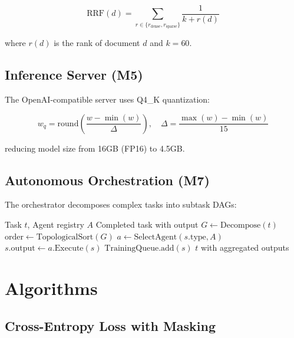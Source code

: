 \documentclass[11pt,a4paper]{article}
\theoremstyle{plain}
\theoremstyle{definition}
\begin{document}
\begin{equation}
    \text{RRF}(d) = \sum_{r \in \{r_{\text{dense}}, r_{\text{sparse}}\}} \frac{1}{k + r(d)}
    \label{eq:rrf}
\end{equation}

where $r(d)$ is the rank of document $d$ and $k = 60$.

\subsection{Inference Server (M5)}

The OpenAI-compatible server uses Q4\_K quantization:

\begin{equation}
    w_q = \text{round}\left(\frac{w - \min(w)}{\Delta}\right), \quad
    \Delta = \frac{\max(w) - \min(w)}{15}
\end{equation}

reducing model size from 16GB (FP16) to 4.5GB.

\subsection{Autonomous Orchestration (M7)}

The orchestrator decomposes complex tasks into subtask DAGs:

\begin{algorithm}[H]
\caption{Task Decomposition}
\begin{algorithmic}[1]
\REQUIRE Task $t$, Agent registry $A$
\ENSURE Completed task with output
\STATE $G \gets \text{Decompose}(t)$ 
\STATE $\text{order} \gets \text{TopologicalSort}(G)$
    \STATE $a \gets \text{SelectAgent}(s.\text{type}, A)$
    \STATE $s.\text{output} \gets a.\text{Execute}(s)$
        \STATE $\text{TrainingQueue}.\text{add}(s)$
    \ENDIF
\ENDFOR
\RETURN $t$ with aggregated outputs
\end{algorithmic}
\end{algorithm}

\section{Algorithms}
\label{sec:algorithms}

\subsection{Cross-Entropy Loss with Masking}
\end{document}

